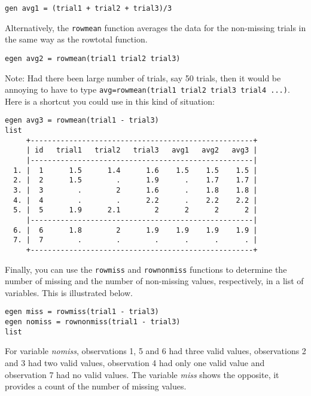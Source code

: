 \begin{lstlisting}
gen avg1 = (trial1 + trial2 + trial3)/3
\end{lstlisting}

Alternatively, the \lstinline{rowmean} function averages the data for the non-missing trials in the same way as the rowtotal function.

\begin{lstlisting}
egen avg2 = rowmean(trial1 trial2 trial3)
\end{lstlisting}

Note:  Had there been large number of trials, say 50 trials, then it would be annoying to have to type \lstinline{avg=rowmean(trial1 trial2 trial3 trial4 ...)}. Here is a shortcut you could use in this kind of situation:

\begin{lstlisting}
egen avg3 = rowmean(trial1 - trial3)
list
     +----------------------------------------------------+
     | id   trial1   trial2   trial3   avg1   avg2   avg3 |
     |----------------------------------------------------|
  1. |  1      1.5      1.4      1.6    1.5    1.5    1.5 |
  2. |  2      1.5        .      1.9      .    1.7    1.7 |
  3. |  3        .        2      1.6      .    1.8    1.8 |
  4. |  4        .        .      2.2      .    2.2    2.2 |
  5. |  5      1.9      2.1        2      2      2      2 |
     |----------------------------------------------------|
  6. |  6      1.8        2      1.9    1.9    1.9    1.9 |
  7. |  7        .        .        .      .      .      . |
     +----------------------------------------------------+
\end{lstlisting}

Finally, you can use the \lstinline{rowmiss} and \lstinline{rownonmiss} functions to determine the number of missing and the number of non-missing values, respectively, in a list of variables. This is illustrated below.

\begin{lstlisting}
egen miss = rowmiss(trial1 - trial3)
egen nomiss = rownonmiss(trial1 - trial3)
list
\end{lstlisting}

For variable \textit{nomiss}, observations 1, 5 and 6 had three valid values, observations 2 and 3 had two valid values, observation 4 had only one valid value and observation 7 had no valid values. The variable \textit{miss} shows the opposite, it provides a count of the number of missing values.

